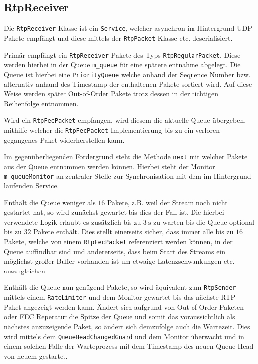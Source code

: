 \documentclass[a4paper,12pt]{article}
\begin{document}
\subsection{RtpReceiver}

Die \texttt{RtpReceiver} Klasse ist ein \texttt{Service}, welcher asynchron im Hintergrund UDP Pakete empfängt und diese mittels der \texttt{RtpPacket} Klasse etc. deserialisiert.

Primär empfängt ein \texttt{RtpReceiver} Pakete des Typs \texttt{RtpRegularPacket}.
Diese werden hierbei in der Queue \texttt{m\_queue} für eine spätere entnahme abgelegt.
Die Queue ist hierbei eine \texttt{PriorityQueue} welche anhand der Sequence Number bzw. alternativ anhand des Timestamp der enthaltenen Pakete sortiert wird.
Auf diese Weise werden später Out-of-Order Pakete trotz dessen in der richtigen Reihenfolge entnommen.

Wird ein \texttt{RtpFecPacket} empfangen, wird diesem die aktuelle Queue übergeben, mithilfe welcher die \texttt{RtpFecPacket} Implementierung bis zu ein verloren gegangenes Paket widerherstellen kann.

Im gegenüberliegenden Fordergrund steht die Methode \texttt{next} mit welcher Pakete aus der Queue entnommen werden können.
Hierbei steht der Monitor \texttt{m\_queueMonitor} an zentraler Stelle zur Synchronisation mit dem im Hintergrund laufenden Service.

Enthält die Queue weniger als $16$ Pakete, z.B. weil der Stream noch nicht gestartet hat, so wird zunächst gewartet bis dies der Fall ist.
Die hierbei verwendete Logik erlaubt es zusätzlich bis zu $\SI{3}{\second}$ zu warten bis die Queue optional bis zu $32$ Pakete enthält.
Dies stellt einerseits sicher, dass immer alle bis zu $16$ Pakete, welche von einem \texttt{RtpFecPacket} referenziert werden können, in der Queue auffindbar sind und andererseits, dass beim Start des Streams ein möglichst großer Buffer vorhanden ist um etwaige Latenzschwankungen etc. auszugleichen.

Enthält die Queue nun genügend Pakete, so wird äquivalent zum \texttt{RtpSender} mittels einem \texttt{RateLimiter} und dem Monitor gewartet bis das nächste RTP Paket angezeigt werden kann.
Ändert sich aufgrund von Out-of-Order Paketen oder FEC Reperatur die Spitze der Queue und somit das voraussichtlich als nächstes anzuzeigende Paket, so ändert sich demzufolge auch die Wartezeit.
Dies wird mittels dem \texttt{QueueHeadChangedGuard} und dem Monitor überwacht und in einem solchen Falle der Warteprozess mit dem Timestamp des neuen Queue Head von neuem gestartet.
\end{document}
